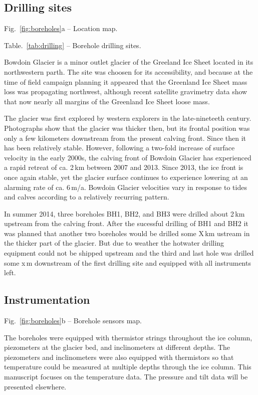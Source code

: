 \documentclass[utf8]{article}
\begin{document}
\subsection{Drilling sites}

    Fig.~\ref{fig:boreholes}a -- Location map.

    Table.~\ref{tab:drilling} -- Borehole drilling sites.

    Bowdoin Glacier is a minor outlet glacier of the Greeland Ice Sheet located
    in its northwestern parth. The site was choosen for its accessibility, and
    because at the time of field campaign planning it appeared that the
    Greenland Ice Sheet mass loss was propagating northwest, although recent
    satellite gravimetry data show that now nearly all margins of the Greenland
    Ice Sheet loose mass.

    The glacier was first explored by western explorers in the late-nineteeth
    century. Photographs show that the glacier was thicker then, but its
    frontal position was only a few kilometers downstream from the present
    calving front. Since then it has been relatively stable. However, following
    a two-fold increase of surface velocity in the early 2000s, the calving
    front of Bowdoin Glacier has experienced a rapid retreat of ca.  2\,km
    between 2007 and 2013. Since 2013, the ice front is once again stable, yet
    the glacier surface continues to experience lowering at an alarming rate of
    ca. 6\,m/a.  Bowdoin Glacier velocities vary in response to tides and
    calves according to a relatively recurring pattern.

    In summer 2014, three boreholes BH1, BH2, and BH3 were drilled about 2\,km
    upstream from the calving front. After the sucessful drilling of BH1 and
    BH2 it was planned that another two boreholes would be drilled some X\,km
    ustream in the thicker part of the glacier. But due to weather the
    hotwater drilling equipment could not be shipped upstream and the third
    and last hole was drilled some x\,m downstream of the first drilling site
    and equipped with all instruments left.


\subsection{Instrumentation}

    Fig.~\ref{fig:boreholes}b -- Borehole sensors map.

    The boreholes were equipped with thermistor strings throughout the ice
    column, piezometers at the glacier bed, and inclinometers at different
    depths. The piezometers and inclinometers were also equipped with
    thermistors so that temperature could be measured at multiple depths
    through the ice column. This manuscript focuses on the temperature data.
    The pressure and tilt data will be presented elsewhere.
\end{document}
